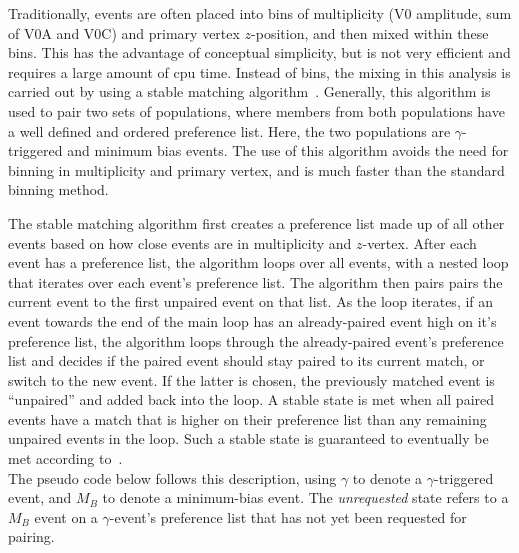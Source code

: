 

Traditionally, events are often placed into bins of multiplicity (V0 amplitude, sum of V0A and V0C) and primary vertex $z$-position, and then mixed within these bins. This has the advantage of conceptual simplicity, but is not very efficient and requires a large amount of cpu time. Instead of bins, the mixing in this analysis is carried out by using a stable matching algorithm~\cite{GALE1985223}. Generally, this algorithm is used to pair two sets of populations, where members from both populations have a well defined and ordered preference list. Here, the two populations are $\gamma$-triggered and minimum bias events. The use of this algorithm avoids the need for binning in multiplicity and primary vertex, and is much faster than the standard binning method.

The stable matching algorithm first creates a preference list made up of all other events based on how close events are in multiplicity and $z$-vertex. After each event has a preference list, the algorithm loops over all events, with a nested loop that iterates over each event's preference list. The algorithm then pairs  pairs the current event to the first unpaired event on that list. As the loop iterates, if an event towards the end of the main loop has an already-paired event high on it’s preference list, the algorithm loops through the already-paired event's preference list and decides if the paired event should stay paired to its current match, or switch to the new event. If the latter is chosen, the previously matched event is “unpaired” and added back into the loop. A stable state is met when all paired events have a match that is higher on their preference list than any remaining unpaired events in the loop. Such a stable state is guaranteed to eventually be met according to~\cite{GALE1985223}.\\

The pseudo code below follows this description, using \(\gamma\) to denote a \(\gamma\)-triggered event, and \(M_B\) to denote a minimum-bias event. The \textit{unrequested} state refers to a \(M_B\) event on a \(\gamma\)-event's preference list that has not yet been requested for pairing.\\

